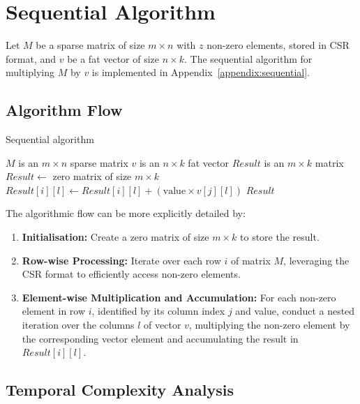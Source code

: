 \documentclass[12pt,oneside]{book} %
\begin{document}
\newpage
\section{Sequential Algorithm}
Let \( M \) be a sparse matrix of size \( m \times n \) with \( z \) non-zero
elements, stored in CSR format, and \( v \) be a fat vector of size \( n \times
k \). The sequential algorithm for multiplying \( M \) by \( v \) is
implemented in Appendix~\ref{appendix:sequential}.

\subsection{Algorithm Flow}

\begin{algorithm}[H]
    \caption{Sequential algorithm}
    \begin{algorithmic}
        \Require $M$ is an $m \times n$ sparse matrix
        \Require $v$ is an $n \times k$ fat vector
        \Ensure  $Result$ is an $m \times k$ matrix
        \State $Result \gets$ zero matrix of size $m \times k$
        \State $Result[i][l] \gets Result[i][l] + (\text{value} \times v[j][l])$
        \EndFor
        \EndFor
        \EndFor
        \State \Return $Result$
    \end{algorithmic}
\end{algorithm}

The algorithmic flow can be more explicitly detailed by:
\begin{enumerate}
    \item \textbf{Initialisation:} Create a zero matrix of size \( m \times k \) to store the result.
    \item \textbf{Row-wise Processing:} Iterate over each row \(i\) of matrix \(M\), leveraging the CSR format to efficiently access non-zero elements.
    \item \textbf{Element-wise Multiplication and Accumulation:} For each non-zero element in row \(i\), identified by its column index \(j\) and value, conduct a nested iteration over the columns \(l\) of vector \(v\), multiplying the non-zero element by the corresponding vector element and accumulating the result in \(Result[i][l]\).
\end{enumerate}

\subsection{Temporal Complexity Analysis}
\end{document}
